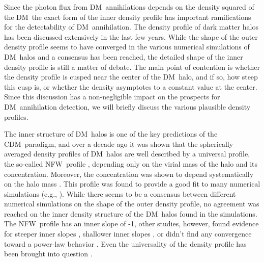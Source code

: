 \documentclass[aps,prd,twocolumn,amsmath,amssymb,floatfix,nofootinbib,10pt]{revtex4}
\newcommand{\eg}{e.g.}
\newcommand{\CDM}{CDM}
\newcommand{\NFW}{NFW}
\newcommand{\DM}{DM}
\begin{document}
Since the photon flux from \DM\ annihilations depends on the density
squared of the \DM\, the exact form of the inner density profile has
important ramifications for the detectability of \DM\
annihilation. The density profile of dark matter halos has been
discussed extensively in the last few years. While the shape of the
outer density profile seems to have converged in the various numerical
simulations of \DM\ halos and a consensus has been reached, the
detailed shape of the inner density profile is still a matter of
debate. The main point of contention is whether the density profile is
cusped near the center of the \DM\ halo, and if so, how steep this
cusp is, or whether the density asymptotes to a constant value at the
center. Since this discussion has a non-negligible impact on the
prospects for \DM\ annihilation detection, we will briefly discuss the
various plausible density profiles.

The inner structure of \DM\ halos is one of the key predictions of the
\CDM\ paradigm, and over a decade ago it was shown that the
spherically averaged density profiles of \DM\ halos are well described
by a universal profile, the so-called \NFW\ profile
\cite{1995MNRAS.275..720N,1996ApJ...462..563N,1997ApJ...490..493N},
depending only on the virial mass of the halo and its
concentration. Moreover, the concentration was shown to depend
systematically on the halo mass
\cite{1996ApJ...462..563N,1997ApJ...490..493N,2001MNRAS.321..559B,2001ApJ...554..114E,2007MNRAS.381.1450N,2008MNRAS.387..536G}. This
profile was found to provide a good fit to many numerical simulations
(\eg,
\cite{1996MNRAS.281..716C,1997MNRAS.286..865T,1997ApJS..111...73K}).
While there seems to be a consensus between different numerical
simulations on the shape of the outer density profile, no agreement
was reached on the inner density structure of the \DM\ halos found in
the simulations. The \NFW\ profile has an inner slope of -1, other
studies, however, found evidence for steeper inner slopes
\cite{1997ApJ...477L...9F,1998ApJ...499L...5M,1999MNRAS.310.1147M,2000ApJ...544..616G,2001ApJ...554..903K,2001ApJ...557..533F,2004MNRAS.353..624D},
shallower inner slopes \cite{1998ApJ...502...48K}, or didn't find any
convergence toward a power-law behavior
\cite{2003MNRAS.338...14P}. Even the universality of the density
profile has been brought into question
\cite{2000ApJ...529L..69J,2000ApJ...535...30J}.
\end{document}
